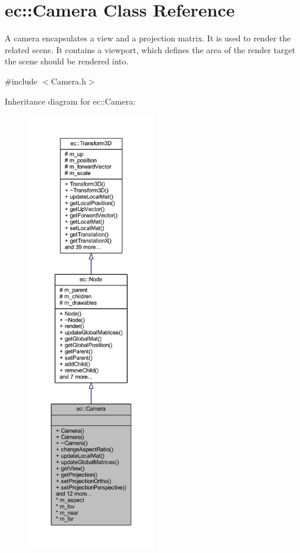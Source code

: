 \hypertarget{classec_1_1_camera}{}\section{ec\+:\+:Camera Class Reference}
\label{classec_1_1_camera}


A camera encapsulates a view and a projection matrix. It is used to render the related scene. It contains a viewport, which defines the area of the render target the scene should be rendered into.  




{\ttfamily \#include $<$Camera.\+h$>$}



Inheritance diagram for ec\+:\+:Camera\+:\nopagebreak
\begin{figure}[H]
\begin{center}
\leavevmode
\includegraphics[height=550pt]{classec_1_1_camera__inherit__graph}
\end{center}
\end{figure}


